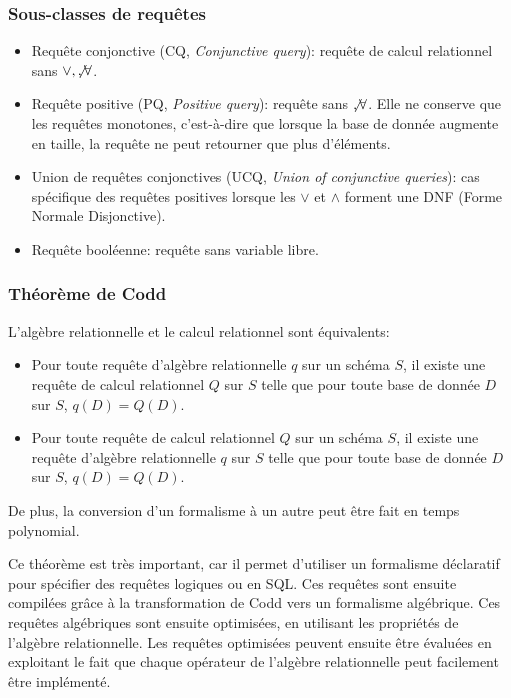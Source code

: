 \documentclass[french, toc]{../cs-classes/cs-classes}
\begin{document}
\subsubsection{Sous-classes de requêtes}
\begin{itemize}
    \item Requête conjonctive (CQ, \emph{Conjunctive query}): requête de calcul relationnel sans $\lor, \not, \forall$.
    \item Requête positive (PQ, \emph{Positive query}): requête sans $\not, \forall$. Elle ne conserve que les requêtes monotones, c'est-à-dire que lorsque la base de donnée augmente en taille, la requête ne peut retourner que plus d'éléments.
    \item Union de requêtes conjonctives (UCQ, \emph{Union of conjunctive queries}): cas spécifique des requêtes positives lorsque les $\lor$ et $\land$ forment une DNF (Forme Normale Disjonctive).
    \item Requête booléenne: requête sans variable libre.
\end{itemize}

\subsubsection{Théorème de Codd}
\begin{theoreme}[Codd, 1972]
    L'algèbre relationnelle et le calcul relationnel sont équivalents:
    \begin{itemize}
        \item Pour toute requête d'algèbre relationnelle $q$ sur un schéma $S$, il existe une requête de calcul relationnel $Q$ sur $S$ telle que pour toute base de donnée $D$ sur $S$, $q(D)=Q(D)$.
        \item Pour toute requête de calcul relationnel $Q$ sur un schéma $S$, il existe une requête d'algèbre relationnelle $q$ sur $S$ telle que pour toute base de donnée $D$ sur $S$, $q(D)=Q(D)$.
    \end{itemize}
    De plus, la conversion d'un formalisme à un autre peut être fait en temps polynomial.
\end{theoreme}

Ce théorème est très important, car il permet d'utiliser un formalisme déclaratif pour spécifier des requêtes logiques ou en SQL. Ces requêtes sont ensuite compilées grâce à la transformation de Codd vers un formalisme algébrique. Ces requêtes algébriques sont ensuite optimisées, en utilisant les propriétés de l'algèbre relationnelle. Les requêtes optimisées peuvent ensuite être évaluées en exploitant le fait que chaque opérateur de l'algèbre relationnelle peut facilement être implémenté.
\end{document}
